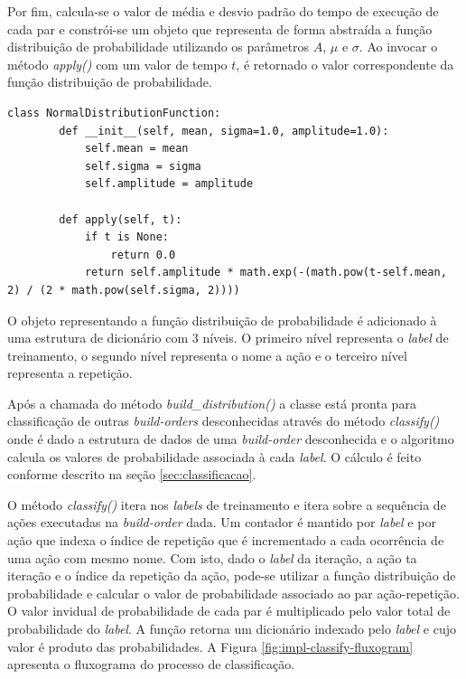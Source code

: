 Por fim, calcula-se o valor de média e desvio padrão do tempo de execução de cada par e constrói-se um objeto que representa de forma abstraída a função distribuição de probabilidade utilizando os parâmetros $A$, $\mu$ e $\sigma$. Ao invocar o método \textit{apply()} com um valor de tempo $t$, é retornado o valor correspondente da função distribuição de probabilidade.

\begin{lstlisting}[breaklines=true]
	class NormalDistributionFunction:
    	def __init__(self, mean, sigma=1.0, amplitude=1.0):
        	self.mean = mean
        	self.sigma = sigma
        	self.amplitude = amplitude

    	def apply(self, t):
        	if t is None:
            	return 0.0
        	return self.amplitude * math.exp(-(math.pow(t-self.mean, 2) / (2 * math.pow(self.sigma, 2))))
\end{lstlisting}

O objeto representando a função distribuição de probabilidade é adicionado à uma estrutura de dicionário com 3 níveis. O primeiro nível representa o \textit{label} de treinamento, o segundo nível representa o nome a ação e o terceiro nível representa a repetição.

Após a chamada do método \textit{build\_distribution()} a classe está pronta para classificação de outras \textit{\glspl{build-order}} desconhecidas através do método \textit{classify()} onde é dado a estrutura de dados de uma \textit{\gls{build-order}} desconhecida e o algoritmo calcula os valores de probabilidade associada à cada \textit{label}. O cálculo é feito conforme descrito na seção \ref{sec:classificacao}.

O método \textit{classify()} itera nos \textit{labels} de treinamento e itera sobre a sequência de ações executadas na \textit{\gls{build-order}} dada. Um contador é mantido por \textit{label} e por ação que indexa o índice de repetição que é incrementado a cada ocorrência de uma ação com mesmo nome. Com isto, dado o \textit{label} da iteração, a ação ta iteração e o índice da repetição da ação, pode-se utilizar a função distribuição de probabilidade e calcular o valor de probabilidade associado ao par ação-repetição. O valor invidual de probabilidade de cada par é multiplicado pelo valor total de probabilidade do \textit{label}. A função retorna um dicionário indexado pelo \textit{label} e cujo valor é produto das probabilidades. A Figura \ref{fig:impl-classify-fluxogram} apresenta o fluxograma do processo de classificação.

